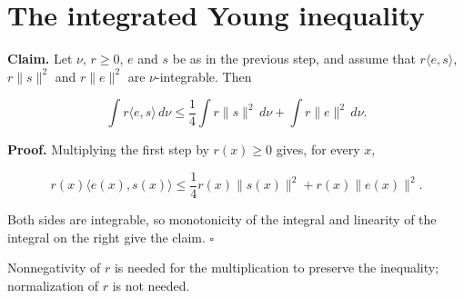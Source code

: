 \documentclass[11pt,a4paper]{article}
\begin{document}
\section{\texorpdfstring{The integrated Young inequality}{The integrated Young inequality}}


\textbf{Claim.} Let \(\nu\), \(r\ge0\), \(e\) and \(s\) be as in the previous step, and assume that \(r\langle e,s\rangle\), \(r\|s\|^2\) and \(r\|e\|^2\) are \(\nu\)-integrable. Then


\[\int r\langle e,s\rangle\,d\nu\le\frac14\int r\|s\|^2\,d\nu+\int r\|e\|^2\,d\nu.\]


\textbf{Proof.} Multiplying the first step by \(r(x)\ge0\) gives, for every \(x\),


\[r(x)\langle e(x),s(x)\rangle\le\frac14r(x)\|s(x)\|^2+r(x)\|e(x)\|^2.\]


Both sides are integrable, so monotonicity of the integral and linearity of the integral on the right give the claim. \(\square\)




Nonnegativity of \(r\) is needed for the multiplication to preserve the inequality; normalization of \(r\) is not needed.
\end{document}
